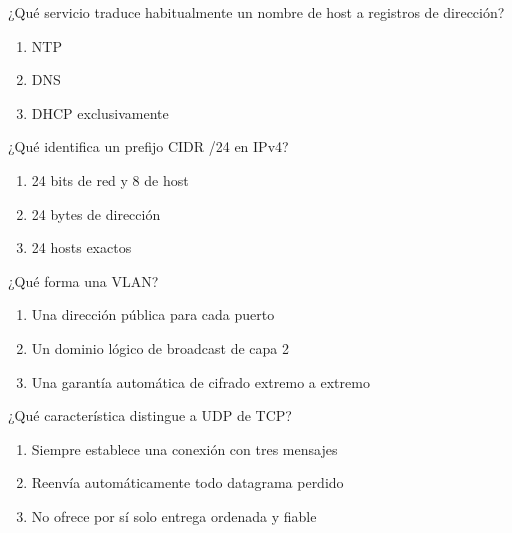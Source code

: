 \noindent\begin{minipage}{\linewidth}\setlength{\parskip}{4pt}\label{q:R-005}
¿Qué servicio traduce habitualmente un nombre de host a registros de dirección?
\begin{enumerate}[label=\Alph*),nosep]
\item NTP
\item DNS
\item DHCP exclusivamente
\end{enumerate}\end{minipage}\par\medskip

\noindent\begin{minipage}{\linewidth}\setlength{\parskip}{4pt}\label{q:R-006}
¿Qué identifica un prefijo CIDR /24 en IPv4?
\begin{enumerate}[label=\Alph*),nosep]
\item 24 bits de red y 8 de host
\item 24 bytes de dirección
\item 24 hosts exactos
\end{enumerate}\end{minipage}\par\medskip

\noindent\begin{minipage}{\linewidth}\setlength{\parskip}{4pt}\label{q:R-007}
¿Qué forma una VLAN?
\begin{enumerate}[label=\Alph*),nosep]
\item Una dirección pública para cada puerto
\item Un dominio lógico de broadcast de capa 2
\item Una garantía automática de cifrado extremo a extremo
\end{enumerate}\end{minipage}\par\medskip

\noindent\begin{minipage}{\linewidth}\setlength{\parskip}{4pt}\label{q:R-008}
¿Qué característica distingue a UDP de TCP?
\begin{enumerate}[label=\Alph*),nosep]
\item Siempre establece una conexión con tres mensajes
\item Reenvía automáticamente todo datagrama perdido
\item No ofrece por sí solo entrega ordenada y fiable
\end{enumerate}\end{minipage}\par\medskip

